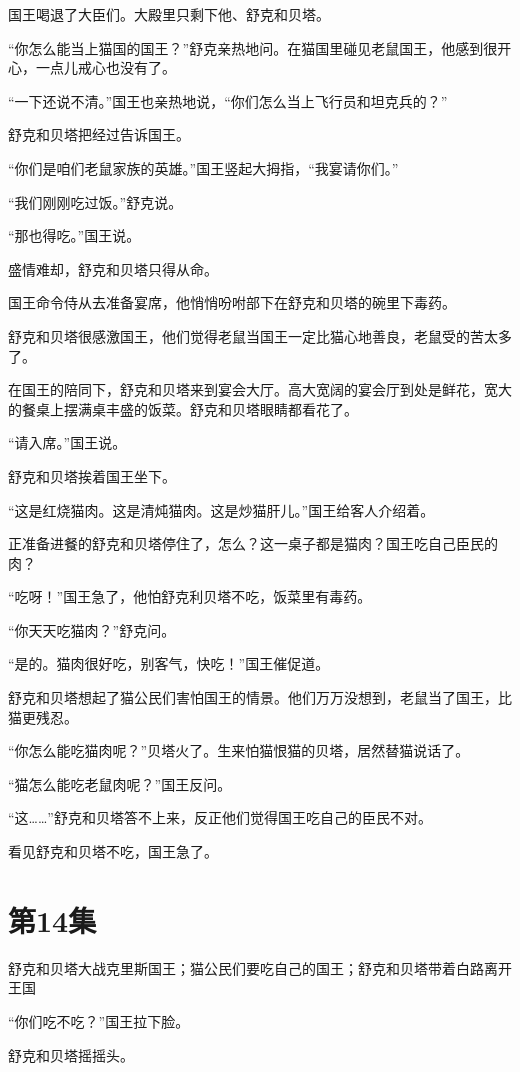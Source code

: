 \documentclass[a4paper,12pt,UTF8,twoside]{ctexbook}
\begin{document}
国王喝退了大臣们。大殿里只剩下他、舒克和贝塔。

“你怎么能当上猫国的国王？”舒克亲热地问。在猫国里碰见老鼠国王，他感到很开心，一点儿戒心也没有了。

“一下还说不清。”国王也亲热地说，“你们怎么当上飞行员和坦克兵的？”

舒克和贝塔把经过告诉国王。

“你们是咱们老鼠家族的英雄。”国王竖起大拇指，“我宴请你们。”

“我们刚刚吃过饭。”舒克说。

“那也得吃。”国王说。

盛情难却，舒克和贝塔只得从命。

国王命令侍从去准备宴席，他悄悄吩咐部下在舒克和贝塔的碗里下毒药。

舒克和贝塔很感激国王，他们觉得老鼠当国王一定比猫心地善良，老鼠受的苦太多了。

在国王的陪同下，舒克和贝塔来到宴会大厅。高大宽阔的宴会厅到处是鲜花，宽大的餐桌上摆满桌丰盛的饭菜。舒克和贝塔眼睛都看花了。

“请入席。”国王说。

舒克和贝塔挨着国王坐下。

“这是红烧猫肉。这是清炖猫肉。这是炒猫肝儿。”国王给客人介绍着。

正准备进餐的舒克和贝塔停住了，怎么？这一桌子都是猫肉？国王吃自己臣民的肉？

“吃呀！”国王急了，他怕舒克利贝塔不吃，饭菜里有毒药。

“你天天吃猫肉？”舒克问。

“是的。猫肉很好吃，别客气，快吃！”国王催促道。

舒克和贝塔想起了猫公民们害怕国王的情景。他们万万没想到，老鼠当了国王，比猫更残忍。

“你怎么能吃猫肉呢？”贝塔火了。生来怕猫恨猫的贝塔，居然替猫说话了。

“猫怎么能吃老鼠肉呢？”国王反问。

“这……”舒克和贝塔答不上来，反正他们觉得国王吃自己的臣民不对。

看见舒克和贝塔不吃，国王急了。
        
\chapter{第14集}

舒克和贝塔大战克里斯国王；猫公民们要吃自己的国王；舒克和贝塔带着白路离开王国

“你们吃不吃？”国王拉下脸。

舒克和贝塔摇摇头。
\end{document}
